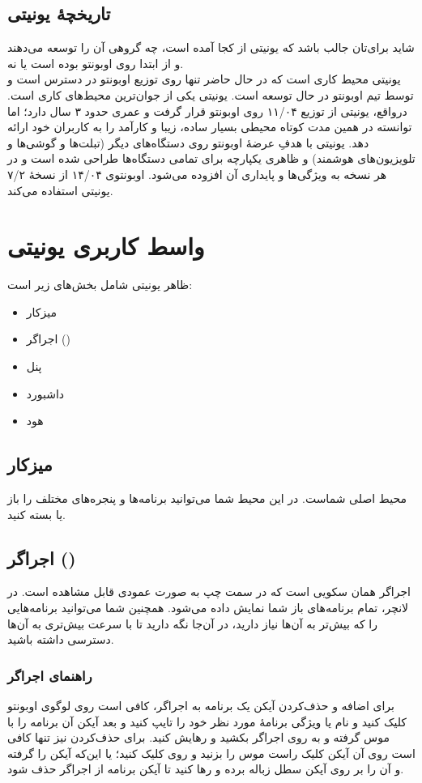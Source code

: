 \subsection{تاریخچهٔ یونیتی}
شاید برای‌تان جالب باشد که یونیتی از کجا آمده است، چه گروهی آن را توسعه می‌دهند و از ابتدا روی اوبونتو بوده است یا نه.\\
یونیتی محیط کاری است که در حال حاضر تنها روی توزیع اوبونتو در دسترس است و توسط تیم اوبونتو در حال توسعه است. یونیتی یکی از جوان‌ترین محیط‌های کاری است. در‌واقع، یونیتی از توزیع ۱۱/۰۴ روی اوبونتو قرار گرفت و عمری حدود ۳ سال دارد؛ اما توانسته در همین مدت کوتاه محیطی بسیار ساده، زیبا و کارآمد را به کاربران خود ارائه دهد. یونیتی با هدفِ عرضهٔ اوبونتو روی دستگاه‌های دیگر (تبلت‌ها و گوشی‌ها و تلویزیون‌های هوشمند) و ظاهری یکپارچه برای تمامی دستگاه‌ها طراحی شده است و در هر نسخه به ویژگی‌ها و پایداری آن افزوده می‌شود. اوبونتوی ۱۴/۰۴ از نسخهٔ ۷/۲ یونیتی استفاده می‌کند.
\section{واسط کاربری یونیتی}
ظاهر یونیتی شامل بخش‌های زیر است:\\
\begin{itemize}
\item میزکار
\item اجراگر ()
\item پنل
\item داشبورد
\item هود
\end{itemize}

\subsection{میزکار}
محیط اصلی شماست. در این محیط شما می‌توانید برنامه‌ها و پنجره‌های مختلف را باز یا بسته کنید.
\subsection[اجراگر (Launcher)]{اجراگر ()}
اجراگر همان سکویی است که در سمت چپ به صورت عمودی قابل مشاهده است. در لانچر، تمام برنامه‌های باز شما نمایش داده می‌شود. همچنین شما می‌توانید برنامه‌هایی را که بیش‌تر به آن‌ها نیاز دارید، در آن‌جا نگه دارید تا با سرعت بیش‌تری به آن‌ها دسترسی داشته باشید.

\subsubsection{راهنمای اجراگر}
برای اضافه و حذف‌کردن آیکن یک برنامه به اجراگر، کافی است روی لوگوی اوبونتو کلیک کنید و نام یا ویژگی برنامهٔ مورد نظر خود را تایپ کنید و بعد آیکن آن برنامه را با موس گرفته و به روی اجراگر بکشید و رهایش کنید. برای حذف‌کردن نیز تنها کافی است روی آن آیکن کلیک راست موس را بزنید و روی  کلیک کنید؛ یا این‌که آیکن را گرفته و آن را بر روی آیکن سطل زباله برده و رها کنید تا آیکن برنامه از اجراگر حذف شود.

